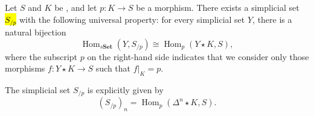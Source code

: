 \begin{proposition} \label{proposition:existence_of_overcategory_simplicial_set_S_slash_p_with_universal_property}
Let $S$ and $K$ be , and let $p : K \to S$ be a morphism. There exists a simplicial set \hl{$S_{/p}$} with the following universal property: for every simplicial set $Y$, there is a natural bijection
$$\operatorname{Hom}_{s\mathbf{Set}}(Y, S_{/p}) \cong \operatorname{Hom}_{p}(Y \star K, S),$$
where the subscript $p$ on the right-hand side indicates that we consider only those morphisms $f : Y \star K \to S$ such that $f|_{K} = p$.

The simplicial set $S_{/p}$ is explicitly given by
$$(S_{/p})_n = \operatorname{Hom}_{p}(\Delta^n \star K, S).$$
\end{proposition}
